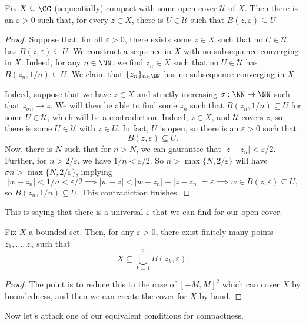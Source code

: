 \begin{lemma}
	Fix $X\subseteq\CC$ (sequentially) compact with some open cover $\mathcal U$ of $X$. Then there is an $\varepsilon>0$ such that, for every $z\in X$, there is $U\in\mathcal U$ such that $B(z,\varepsilon)\subseteq U$.
\end{lemma}
\begin{proof}
	Suppose that, for all $\varepsilon>0$, there exists some $z\in X$ such that no $U\in\mathcal U$ has $B(z,\varepsilon)\subseteq U$. We construct a sequence in $X$ with no subsequence converging in $X$. Indeed, for any $n\in\NN$, we find $z_n\in X$ such that no $U\in\mathcal U$ has $B(z_n,1/n)\subseteq U$. We claim that $\{z_n\}_{n\in\NN}$ has no subsequence converging in $X$.

	Indeed, suppose that we have $z\in X$ and strictly increasing $\sigma:\NN\to\NN$ such that $z_{\sigma n}\to z$. We will then be able to find some $z_n$ such that $B(z_n,1/n)\subseteq U$ for some $U\in\mathcal U$, which will be a contradiction. Indeed, $z\in X$, and $\mathcal U$ covers $z$, so there is some $U\in\mathcal U$ with $z\in U$. In fact, $U$ is open, so there is an $\varepsilon>0$ such that
	\[B(z,\varepsilon)\subseteq U.\]
	Now, there is $N$ such that for $n>N$, we can gaurantee that $|z-z_n|<\varepsilon/2$. Further, for $n>2/\varepsilon$, we have $1/n<\varepsilon/2$. So $n>\max\{N,2/\varepsilon\}$ will have $\sigma n>\max\{N,2/\varepsilon\}$, implying
	\[|w-z_n|<1/n<\varepsilon/2\implies|w-z|<|w-z_n|+|z-z_n|=\varepsilon\implies w\in B(z,\varepsilon)\subseteq U,\]
	so $B(z_n,1/n)\subseteq U$. This contradiction finishes.
\end{proof}
This is saying that there is a universal $\varepsilon$ that we can find for our open cover.
\begin{lemma}
	Fix $X$ a bounded set. Then, for any $\varepsilon>0$, there exist finitely many points $z_1,\ldots,z_n$ such that
	\[X\subseteq\bigcup_{k=1}^nB(z_k,\varepsilon).\]
\end{lemma}
\begin{proof}
	The point is to reduce this to the case of $[-M,M]^2$ which can cover $X$ by boundedness, and then we can create the cover for $X$ by hand.
\end{proof}
Now let's attack one of our equivalent conditions for compactness.
\closedbounded*
